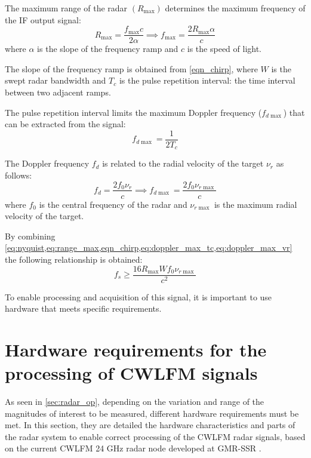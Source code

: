 The maximum range of the radar $(R_{\max})$ determines the maximum frequency of the IF output signal:
\begin{equation}\label{eq:range_max}
	R_{\max} = \frac{f_{\max} c}{2 \alpha} \implies f_{\max} = \frac{2R_{\max} \alpha}{c}
\end{equation}
where $\alpha$ is the slope of the frequency ramp and $c$ is the speed of light.

The slope of the frequency ramp is obtained from \cref{eqn_chirp}, where $W$ is the swept radar bandwidth and $T_c$ is the pulse repetition interval: the time interval between two adjacent ramps.

The pulse repetition interval limits the maximum Doppler frequency ($f_{d\max}$) that can be extracted from the signal:
\begin{equation} \label{eq:doppler_max_tc}
	f_{d\max} = \frac{1}{2 T_c}
\end{equation}

The Doppler frequency $f_d$ is related to the radial velocity of the target $\nu_r$ as follows:
\begin{equation} \label{eq:doppler_max_vr}
	f_d = \frac{2 f_0 \nu_r}{c} \implies f_{d\max} = \frac{2 f_0 \nu_{r\max}}{c}
\end{equation}
where $f_0$ is the central frequency of the radar and $\nu_{r\max}$ is the maximum radial velocity of the target.

By combining \cref{eq:nyquist,eq:range_max,eqn_chirp,eq:doppler_max_tc,eq:doppler_max_vr} the following relationship is obtained:
\begin{equation} \label{eq:fs_final}
	f_s \ge \frac{16 R_{\max}W f_0 \nu_{r\max}}{c^2}
\end{equation}

To enable processing and acquisition of this signal, it is important to use hardware that meets specific requirements.

\section[Hardware requirements for CWLFM signal processing]{Hardware requirements for the processing of CWLFM signals} \label{sec:general_hw_req}

As seen in \cref{sec:radar_op}, depending on the variation and range of the magnitudes of interest to be measured, different hardware requirements must be met. In this section, they are detailed the hardware characteristics and parts of the radar system to enable correct processing of the CWLFM radar signals, based on the current CWLFM 24 GHz radar node developed at GMR-SSR \cite{Montesano2019}.

